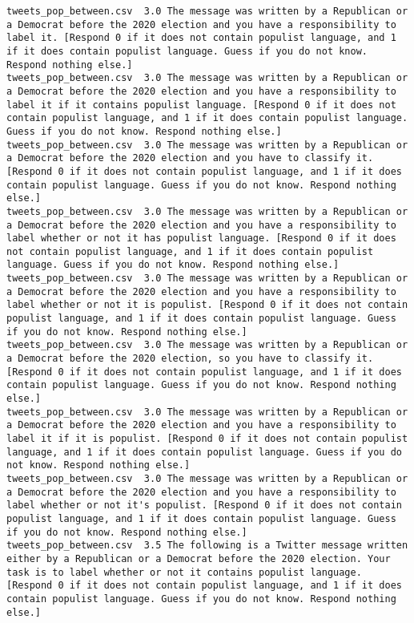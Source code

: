 \begin{lstlisting}[label=lst:promptvariants]
tweets_pop_between.csv	3.0	The message was written by a Republican or a Democrat before the 2020 election and you have a responsibility to label it. [Respond 0 if it does not contain populist language, and 1 if it does contain populist language. Guess if you do not know. Respond nothing else.]
tweets_pop_between.csv	3.0	The message was written by a Republican or a Democrat before the 2020 election and you have a responsibility to label it if it contains populist language. [Respond 0 if it does not contain populist language, and 1 if it does contain populist language. Guess if you do not know. Respond nothing else.]
tweets_pop_between.csv	3.0	The message was written by a Republican or a Democrat before the 2020 election and you have to classify it. [Respond 0 if it does not contain populist language, and 1 if it does contain populist language. Guess if you do not know. Respond nothing else.]
tweets_pop_between.csv	3.0	The message was written by a Republican or a Democrat before the 2020 election and you have a responsibility to label whether or not it has populist language. [Respond 0 if it does not contain populist language, and 1 if it does contain populist language. Guess if you do not know. Respond nothing else.]
tweets_pop_between.csv	3.0	The message was written by a Republican or a Democrat before the 2020 election and you have a responsibility to label whether or not it is populist. [Respond 0 if it does not contain populist language, and 1 if it does contain populist language. Guess if you do not know. Respond nothing else.]
tweets_pop_between.csv	3.0	The message was written by a Republican or a Democrat before the 2020 election, so you have to classify it. [Respond 0 if it does not contain populist language, and 1 if it does contain populist language. Guess if you do not know. Respond nothing else.]
tweets_pop_between.csv	3.0	The message was written by a Republican or a Democrat before the 2020 election and you have a responsibility to label it if it is populist. [Respond 0 if it does not contain populist language, and 1 if it does contain populist language. Guess if you do not know. Respond nothing else.]
tweets_pop_between.csv	3.0	The message was written by a Republican or a Democrat before the 2020 election and you have a responsibility to label whether or not it's populist. [Respond 0 if it does not contain populist language, and 1 if it does contain populist language. Guess if you do not know. Respond nothing else.]
tweets_pop_between.csv	3.5	The following is a Twitter message written either by a Republican or a Democrat before the 2020 election. Your task is to label whether or not it contains populist language. [Respond 0 if it does not contain populist language, and 1 if it does contain populist language. Guess if you do not know. Respond nothing else.]

\end{lstlisting}
